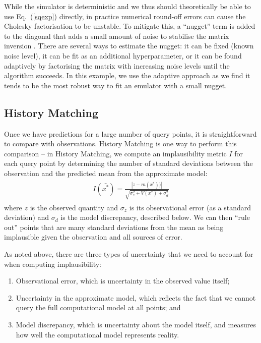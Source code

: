 \documentclass[openacc]{rstransa}%
\begin{document}
While the simulator is deterministic and we thus should theoretically be able to use Eq.~(\ref{sqexp})
directly, in practice numerical round-off errors can cause the Cholesky factorisation to be
unstable. To mitigate this, a ``nugget'' term is added to the diagonal that adds a small amount
of noise to stabilise the matrix inversion \cite{nugget}. There are several ways to estimate the nugget: it can
be fixed (known noise level), it can be fit as an additional hyperparameter, or it can be found
adaptively by factorising the matrix with increasing noise levels until the algorithm succeeds.
In this example, we use the adaptive approach as we find it tends to be the most robust way to fit an
emulator with a small nugget.

\subsection{History Matching}

Once we have predictions for a large number of query points, it is straightforward to compare with observations.
History Matching is one way to perform this comparison \cite{histmatch} -- in History Matching, we compute an implausibility
metric $I$ for each query point by determining the number of standard deviations between the observation and the
predicted mean from the approximate model:
\begin{align}\label{implaus}
\begin{split}
I(\bar{x^*}) = \frac{|z - m(x^*))|}{\sqrt{\sigma_z^2+V(x^*)+\sigma_d^2}}
\end{split}
\end{align}
where $z$ is the observed quantity and $\sigma_z$ is its observational error (as a standard deviation) and
$\sigma_d$ is the model discrepancy, described below. We can then ``rule out'' points that are many standard deviations from the mean as being implausible given the observation and all sources of error.

As noted above, there are three types of uncertainty that we need to account for when computing implausibility:

\begin{enumerate}
\item Observational error, which is uncertainty in the observed value itself;
\item Uncertainty in the approximate model, which reflects the fact that we cannot query the full computational model at all points; and
\item Model discrepancy, which is uncertainty about the model itself, and measures how well the computational model represents reality.
\end{enumerate}
\end{document}
